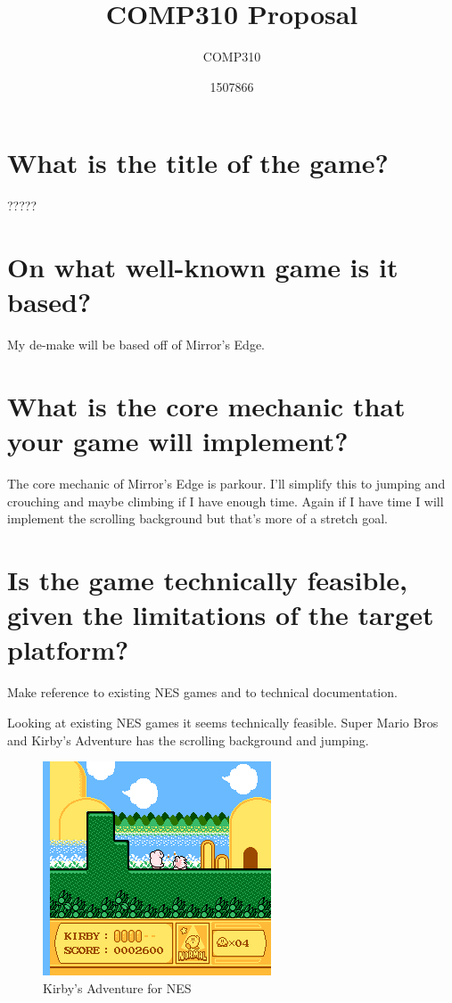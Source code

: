\documentclass{scrartcl}
\title{COMP310 Proposal}
\subtitle{COMP310}
\author{1507866}
\begin{document}
	
\maketitle
\section{What is the title of the game?}
?????
\section{On what well-known game is it based?}
My de-make will be based off of Mirror's Edge. 

\section{What is the core mechanic that your game will implement?}
The core mechanic of Mirror's Edge is parkour. I'll simplify this to jumping and crouching and maybe climbing if I have enough time.
Again if I have time I will implement the scrolling background but that's more of a stretch goal.

\section{Is the game technically feasible, given the limitations of the target platform?}
Make reference to existing NES games and to technical documentation.

Looking at existing NES games it seems technically feasible. Super Mario Bros and Kirby's Adventure has the scrolling background and jumping.

\begin{figure}[]
	\includegraphics[width=0.5\linewidth]{Kirby.PNG}
	\caption{Kirby's Adventure for NES }
\end{figure}
\end{document}
